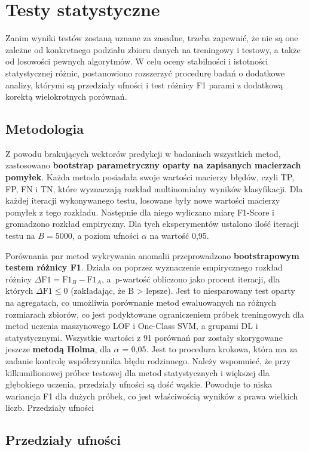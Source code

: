 \documentclass[a4paper,twoside,12pt]{book}
\begin{document}
\section{Testy statystyczne}
Zanim wyniki testów zostaną uznane za zasadne, trzeba zapewnić, że nie są one zależne od konkretnego podziału zbioru danych na treningowy i testowy, a także od losowości pewnych algorytmów. W celu oceny stabilności i istotności statystycznej różnic, postanowiono rozszerzyć procedurę badań o dodatkowe analizy, którymi są przedziały ufności i test różnicy F1 parami z dodatkową korektą wielokrotnych porównań. 

\subsection{Metodologia}
Z powodu brakujących wektorów predykcji w badaniach wszystkich metod, zastosowano \textbf{bootstrap parametryczny oparty na zapisanych macierzach pomyłek}. Każda metoda posiadała swoje wartości macierzy błędów, czyli TP, FP, FN i TN, które wyznaczają rozkład multinomialny wyników klasyfikacji. Dla każdej iteracji wykonywanego testu, losowane były nowe wartości macierzy pomyłek z tego rozkładu. Następnie dla niego wyliczano miarę F1-Score i gromadzono rozkład empiryczny. Dla tych eksperymentów ustalono ilość iteracji testu na $B = 5000$, a poziom ufności $\alpha$ na wartość 0{,}95.
 
Porównania par metod wykrywania anomalii przeprowadzono  \textbf{bootstrapowym testem różnicy F1}. Działa on poprzez wyznaczenie empirycznego rozkład różnicy $\Delta\text{F1} = \text{F1}_B - \text{F1}_A$, a~p-wartość obliczono jako procent iteracji, dla których $\Delta\text{F1} \leq 0$ (zakładając, że B > lepsze). Jest to niesparowany test oparty na agregatach, co umożliwia porównanie metod ewaluowanych na różnych rozmiarach zbiorów, co jest podyktowane ograniczeniem próbek treningowych dla metod uczenia maszynowego LOF i One-Class SVM, a grupami DL i statystycznymi. Wszystkie wartości z 91 porównań par zostały skorygowane jeszcze \textbf{metodą Holma}, dla $\alpha$ = 0{,}05. Jest to procedura krokowa, która ma za zadanie kontrolę współczynnika błędu rodzinnego. Należy wspomnieć, że przy kilkumilionowej próbce testowej dla metod statystycznych i większej dla głębokiego uczenia, przedziały ufności są dość wąskie. Powoduje to niska wariancja F1 dla dużych próbek, co jest właściwością wyników z prawa wielkich liczb.   
Przedziały ufności

\subsection{Przedziały ufności}
\end{document}
